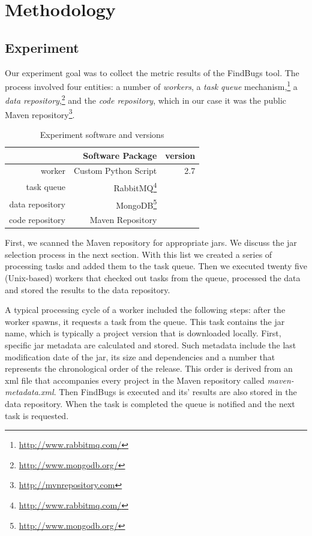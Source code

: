 \documentclass[conference]{IEEEtran}
\begin{document}
\section{Methodology}
\label{sec:meth}

\subsection{Experiment}
\label{sec:exp}

Our experiment goal was to collect the metric results of the FindBugs tool.
The process involved four entities: a number of {\it workers}, a
{\it task queue} mechanism,\footnote{\url{http://www.rabbitmq.com/}}
a {\it data repository},\footnote{\url{http://www.mongodb.org/}}
and the {\it code repository}, which in our case it was the public Maven 
repository\footnote{\url{http://mvnrepository.com}}.

\begin{table}
\centering
\caption{Experiment software and versions}
\label{tbl:soft-version}
\begin{tabular}{r r r}
\hline
 & Software Package & version\\
 \hline
worker & Custom Python Script & 2.7\\
task queue & RabbitMQ\footnote{\url{http://www.rabbitmq.com/}} & \\
data repository & MongoDB\footnote{\url{http://www.mongodb.org/}} & \\
code repository & Maven Repository & \\
\hline
\end{tabular}
\end{table}

First, we scanned the Maven repository for appropriate {\sc jar}s.
We discuss the {\sc jar} selection process in the next 
section. With this list we created a series of processing tasks
and added them to the task queue. Then we
executed twenty five (Unix-based) workers that checked out tasks from the queue,
processed the data and stored the results to the data repository.

A typical processing cycle of a worker included the following steps: after
the worker spawns, it requests a task from the queue. This task contains
the {\sc jar} name, which is typically a project version that is downloaded locally.
First, specific {\sc jar} metadata are calculated and stored. Such metadata include the
last modification date of the {\sc jar}, its size and dependencies and a number that
represents the chronological order of the release. This order is derived from an {\sc xml} file that
accompanies every project in the Maven repository called {\it
maven-metadata.xml}. Then FindBugs is executed and its' results are also stored
in the data repository. When the task is completed the queue is notified and
the next task is requested.
\end{document}
